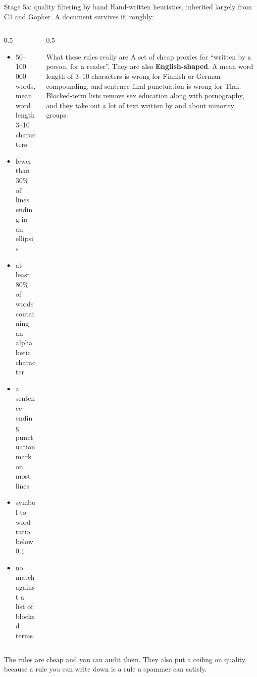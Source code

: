 \documentclass[aspectratio=169,10pt]{beamer}
\begin{document}
\begin{frame}[shrink=7]{Stage 5a: quality filtering by hand}
  Hand-written heuristics, inherited largely from C4 and Gopher. A document
  survives if, roughly:
  \vspace{0.5em}
  \begin{columns}[T]
    \begin{column}{0.5\textwidth}
      \small
      \begin{itemize}
        \item 50--100\,000 words, mean word length 3--10 characters
        \item fewer than 30\% of lines ending in an ellipsis
        \item at least 80\% of words containing an alphabetic character
        \item a sentence-ending punctuation mark on most lines
        \item symbol-to-word ratio below $0.1$
        \item no match against a list of blocked terms
      \end{itemize}
    \end{column}
    \begin{column}{0.5\textwidth}
      \begin{block}{What these rules really are}
        \small
        A set of cheap proxies for ``written by a person, for a reader''.
        \vspace{0.4em}
        They are also \textbf{English-shaped}. A mean word length of 3--10
        characters is wrong for Finnish or German compounding, and
        sentence-final punctuation is wrong for Thai. Blocked-term lists remove
        sex education along with pornography, and they take out a lot of text
        written by and about minority groups.
      \end{block}
    \end{column}
  \end{columns}
  \vspace{0.5em}
  \small
  The rules are cheap and you can audit them. They also put a ceiling on
  quality, because a rule you can write down is a rule a spammer can satisfy.
\end{frame}
\end{document}
